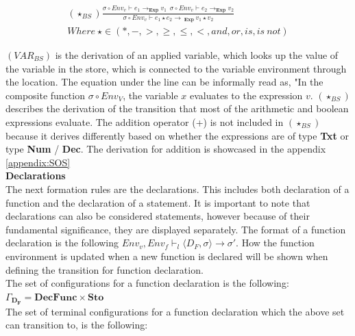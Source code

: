 \begin{equation}
\begin{split}
    (\star_{BS})\frac{\sigma \circ Env_v\vdash e_1 \rightarrow _{\textbf{Exp}} v_1 \ \ \sigma \circ Env_v \vdash e_2 \rightarrow _{\textbf{Exp}} v_2 }{\sigma \circ Env_v \vdash e_1 \star e_2 \rightarrow \ _{\textbf{Exp}} \ v_1 \star v_2 } \\
    Where \ \star \in (*, -, >, \geq, \leq, <, and, or, is, is \ not)
\end{split}
\end{equation}

\noindent $(VAR_{BS})$ is the derivation of an applied variable, which looks up the value of the variable in the store, which is connected to the variable environment through the location. The equation under the line can be informally read as, "In the composite function $\sigma \circ Env_V$, the variable $x$ evaluates to the expression $v$. $(\star_{BS})$ describes the derivation of the transition that most of the arithmetic and boolean expressions evaluate. The addition operator (+) is not included in $(\star_{BS})$ because it derives differently based on whether the expressions are of type \textbf{Txt} or type \textbf{Num} / \textbf{Dec}. The derivation for addition is showcased in the appendix \ref{appendix:SOS} \\

\noindent \textbf{Declarations} \\

\noindent The next formation rules are the declarations. This includes both declaration of a function and the declaration of a statement. It is important to note that declarations can also be considered statements, however because of their fundamental significance, they are displayed separately. The format of a function declaration is the following $Env_v, Env_f \vdash _l \langle D_F, \sigma \rangle \rightarrow \sigma'$. How the function environment is updated when a new function is declared will be shown when defining the transition for function declaration. \\

\noindent The set of configurations for a function declaration is the following: \\

$\Gamma _{\mathbf{D_F}} = \textbf{DecFunc} \times \textbf{Sto}$ \\

\noindent The set of terminal configurations for a function declaration which the above set can transition to, is the following: \\

